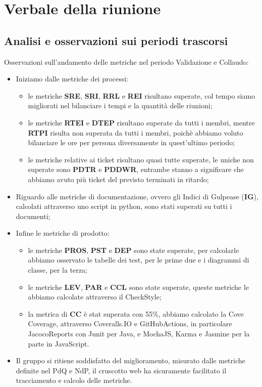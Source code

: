 \section{Verbale della riunione}

\subsection{Analisi e osservazioni sui periodi trascorsi}
Osservazioni sull'andamento delle metriche nel periodo Validazione e Collaudo:
\begin{itemize}
	\item Iniziamo dalle metriche dei processi:
		\begin{itemize}
			\item le metriche \textbf{SRE}, \textbf{SRI}, \textbf{RRL} e \textbf{REI} risultano superate, col tempo siamo migliorati nel bilanciare i tempi e la quantità delle riunioni;
			\item le metriche \textbf{RTEI} e \textbf{DTEP} risultano superate da tutti i membri, mentre \textbf{RTPI} risulta non superata da tutti i membri, poichè abbiamo voluto bilanciare le ore per persona diversamente in quest'ultimo periodo;
			\item le metriche relative ai ticket risultano quasi tutte superate, le uniche non superate sono \textbf{PDTR} e \textbf{PDDWR}, entrambe stanno a significare che abbiamo avuto più ticket del previsto terminati in ritardo;
		\end{itemize}
	\item Riguardo alle metriche di documentazione, ovvero gli Indici di Gulpease (\textbf{IG}), calcolati attraverso uno script in python, sono stati superati su tutti i documenti;
	\item Infine le metriche di prodotto:
		\begin{itemize}
			\item le metriche \textbf{PROS}, \textbf{PST} e \textbf{DEP} sono state superate, per calcolarle abbiamo osservato le tabelle dei test, per le prime due e i diagrammi di classe, per la terza;
			\item le metriche \textbf{LEV}, \textbf{PAR} e \textbf{CCL} sono state superate, queste metriche le abbiamo calcolate attraverso il CheckStyle;
			\item la metrica di \textbf{CC} è stat superata con 55\%, abbiamo calcolato la Cove Coverage, attraverso Coveralls.IO e GitHubActions, in particolare JacocoReports con Junit per Java, e MochaJS, Karma e Jasmine per la parte in JavaScript.
		\end{itemize}
	\item Il gruppo si ritiene soddisfatto del miglioramento, misurato dalle metriche definite nel PdQ e NdP, il cruscotto web ha sicuramente facilitato il tracciamento e calcolo delle metriche.
\end{itemize}

